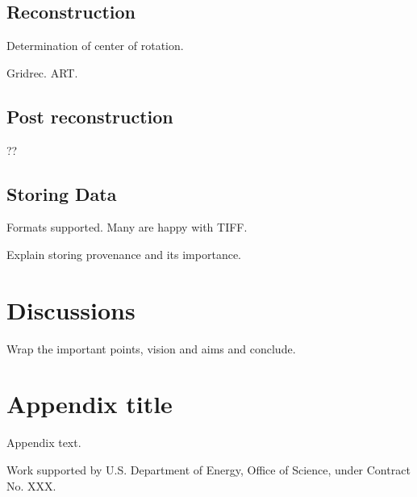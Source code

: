 \documentclass[pdf]{iucr}              %
\begin{document}
\subsection{Reconstruction}

Determination of center of rotation.

Gridrec. ART. 

\subsection{Post reconstruction}

??

\subsection{Storing Data}

Formats supported. Many are happy with TIFF. 

Explain storing provenance and its importance.

\section{Discussions}

Wrap the important points, vision and aims and conclude.

\appendix
\section{Appendix title}

Appendix text.



Work supported by U.S. Department of Energy, Office of Science, under Contract No. XXX.




 
\end{document}
